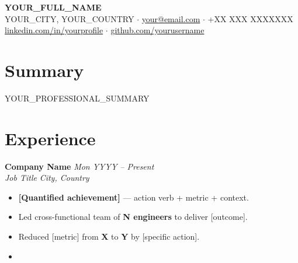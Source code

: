 \providecommand{\TargetCompany}{General Application}
\providecommand{\TargetRole}{YOUR_TARGET_ROLE}
\providecommand{\JobKeywords}{}

\newcommand{\cventry}[4]{%
  \textbf{#1} \hfill \textit{\small #3} \\
  \textit{#2} \hfill \textit{\small\color{muted} #4}
  \vspace{1pt}
}
\newcommand{\cveducation}[4]{%
  \textbf{#1} \hfill \textit{\small #3} \\
  \textit{#2} \hfill \textit{\small\color{muted} #4}
  \vspace{1pt}
}


\pagestyle{empty}

\begin{center}
  {\LARGE\bfseries YOUR\_FULL\_NAME}\\[4pt]
  \small
  YOUR\_CITY, YOUR\_COUNTRY
  $\cdot$ \href{mailto:your@email.com}{your@email.com}
  $\cdot$ +XX XXX XXXXXXX \\
  \href{https://linkedin.com/in/yourprofile}{linkedin.com/in/yourprofile}
  $\cdot$ \href{https://github.com/yourusername}{github.com/yourusername}
\end{center}

\vspace{4pt}

\section{Summary}

YOUR\_PROFESSIONAL\_SUMMARY

\section{Experience}

\cventry
  {Company Name}{Job Title}{Mon YYYY -- Present}{City, Country}
\begin{itemize}
  \item \textbf{[Quantified achievement]} — action verb + metric + context.
  \item Led cross-functional team of \textbf{N engineers} to deliver [outcome].
  \item Reduced [metric] from \textbf{X} to \textbf{Y} by [specific action].
  \item [Next achievement — action verb + metric + context]
\end{itemize}

